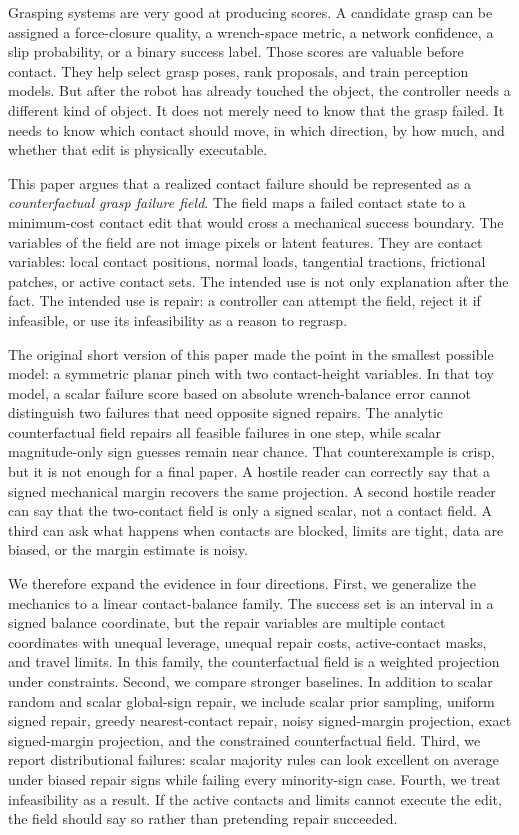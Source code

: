 \documentclass{article}
\begin{document}
Grasping systems are very good at producing scores. A candidate grasp can be assigned a force-closure quality, a wrench-space metric, a network confidence, a slip probability, or a binary success label. Those scores are valuable before contact. They help select grasp poses, rank proposals, and train perception models. But after the robot has already touched the object, the controller needs a different kind of object. It does not merely need to know that the grasp failed. It needs to know which contact should move, in which direction, by how much, and whether that edit is physically executable.

This paper argues that a realized contact failure should be represented as a \emph{counterfactual grasp failure field}. The field maps a failed contact state to a minimum-cost contact edit that would cross a mechanical success boundary. The variables of the field are not image pixels or latent features. They are contact variables: local contact positions, normal loads, tangential tractions, frictional patches, or active contact sets. The intended use is not only explanation after the fact. The intended use is repair: a controller can attempt the field, reject it if infeasible, or use its infeasibility as a reason to regrasp.

The original short version of this paper made the point in the smallest possible model: a symmetric planar pinch with two contact-height variables. In that toy model, a scalar failure score based on absolute wrench-balance error cannot distinguish two failures that need opposite signed repairs. The analytic counterfactual field repairs all feasible failures in one step, while scalar magnitude-only sign guesses remain near chance. That counterexample is crisp, but it is not enough for a final paper. A hostile reader can correctly say that a signed mechanical margin recovers the same projection. A second hostile reader can say that the two-contact field is only a signed scalar, not a contact field. A third can ask what happens when contacts are blocked, limits are tight, data are biased, or the margin estimate is noisy.

We therefore expand the evidence in four directions. First, we generalize the mechanics to a linear contact-balance family. The success set is an interval in a signed balance coordinate, but the repair variables are multiple contact coordinates with unequal leverage, unequal repair costs, active-contact masks, and travel limits. In this family, the counterfactual field is a weighted projection under constraints. Second, we compare stronger baselines. In addition to scalar random and scalar global-sign repair, we include scalar prior sampling, uniform signed repair, greedy nearest-contact repair, noisy signed-margin projection, exact signed-margin projection, and the constrained counterfactual field. Third, we report distributional failures: scalar majority rules can look excellent on average under biased repair signs while failing every minority-sign case. Fourth, we treat infeasibility as a result. If the active contacts and limits cannot execute the edit, the field should say so rather than pretending repair succeeded.
\end{document}
